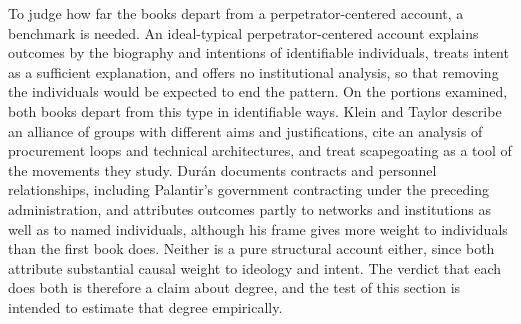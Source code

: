 \documentclass[12pt]{article}
\theoremstyle{remark}
\begin{document}
To judge how far the books depart from a perpetrator-centered account, a benchmark is needed. An ideal-typical perpetrator-centered account explains outcomes by the biography and intentions of identifiable individuals, treats intent as a sufficient explanation, and offers no institutional analysis, so that removing the individuals would be expected to end the pattern. On the portions examined, both books depart from this type in identifiable ways. Klein and Taylor describe an alliance of groups with different aims and justifications, cite an analysis of procurement loops and technical architectures, and treat scapegoating as a tool of the movements they study. Durán documents contracts and personnel relationships, including Palantir's government contracting under the preceding administration, and attributes outcomes partly to networks and institutions as well as to named individuals, although his frame gives more weight to individuals than the first book does. Neither is a pure structural account either, since both attribute substantial causal weight to ideology and intent. The verdict that each does both is therefore a claim about degree, and the test of this section is intended to estimate that degree empirically.
\end{document}

